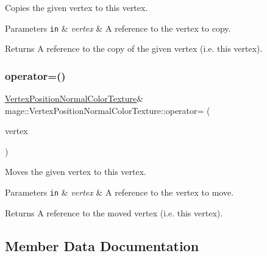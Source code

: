 Copies the given vertex to this vertex.


\begin{DoxyParams}[1]{Parameters}
\mbox{\tt in}  & {\em vertex} & A reference to the vertex to copy. \\
\hline
\end{DoxyParams}
\begin{DoxyReturn}{Returns}
A reference to the copy of the given vertex (i.\+e. this vertex). 
\end{DoxyReturn}
\hypertarget{structmage_1_1_vertex_position_normal_color_texture_a98da26b1f52c0b98b44fd3a99080615a}{}\label{structmage_1_1_vertex_position_normal_color_texture_a98da26b1f52c0b98b44fd3a99080615a} 
\subsubsection{\texorpdfstring{operator=()}{operator=()}\hspace{0.1cm}{\footnotesize\ttfamily [2/2]}}
{\footnotesize\ttfamily \hyperlink{structmage_1_1_vertex_position_normal_color_texture}{Vertex\+Position\+Normal\+Color\+Texture}\& mage\+::\+Vertex\+Position\+Normal\+Color\+Texture\+::operator= (\begin{DoxyParamCaption}\item[{\hyperlink{structmage_1_1_vertex_position_normal_color_texture}{Vertex\+Position\+Normal\+Color\+Texture} \&\&}]{vertex }\end{DoxyParamCaption})\hspace{0.3cm}{\ttfamily [default]}}

Moves the given vertex to this vertex.


\begin{DoxyParams}[1]{Parameters}
\mbox{\tt in}  & {\em vertex} & A reference to the vertex to move. \\
\hline
\end{DoxyParams}
\begin{DoxyReturn}{Returns}
A reference to the moved vertex (i.\+e. this vertex). 
\end{DoxyReturn}


\subsection{Member Data Documentation}
\hypertarget{structmage_1_1_vertex_position_normal_color_texture_a6b28cefeab374c3f38c44b49eea2ec78}{}\label{structmage_1_1_vertex_position_normal_color_texture_a6b28cefeab374c3f38c44b49eea2ec78} 
